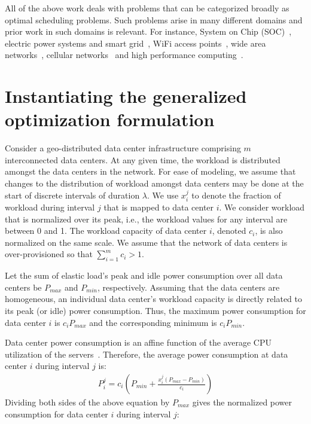 All of the above work deals with problems that can be categorized broadly as optimal scheduling problems. Such problems arise in many different domains and prior work in such domains is relevant. For instance, System on Chip (SOC)~\cite{Fang:2011:COP:1995896.1995940}, electric power systems and smart grid~\cite{Javed:2008:ULP:1485753.1485792,Logenthiran2011138,Celli:2001:PICA,FahadJavedAdOpt.SASO.2009.26}, WiFi access points~\cite{Marsan:2010:SAM:1791314.1791340}, wide area networks~\cite{Cavdar:2011:ECOC}, cellular networks~\cite{Peng:2011:BTSSaving:Mobicom} and high performance computing~\cite{Lee:ServerConsolidation:2011:Globecom,Pinheiro01loadbalancing,Yao:DCPowerReduction:2012:INFOCOM,Herodotou:Starfish:2011:CIDR,Herodotou:2011:NOS:2038916.2038934,Aikema:ElecCostHPC:2011:ISSST}.

\section{Instantiating the generalized optimization formulation}\label{sec:case1:instantiating} %
Consider a geo-distributed data center infrastructure
comprising $m$ interconnected data
centers. At any given time, the workload is distributed amongst the data
centers in the network. For ease of modeling, we assume that changes to the distribution of workload amongst data centers may be done at the start of discrete intervals of duration $\lambda$. We use $x_i^j$ to denote the fraction of workload during interval $j$ that is mapped to data center $i$.  We consider workload that is normalized over its peak, i.e., the workload values for any interval are between 0 and 1. The workload capacity of data center $i$, denoted $c_i$, is also normalized on the same scale. We assume that the network of data centers is over-provisioned so that $\sum_{i=1}^m c_i > 1$.

Let the sum of elastic load's peak and idle power consumption over all data centers be $P_{max}$ and $P_{min}$, respectively. Assuming that the data centers are homogeneous, an individual data center's workload capacity is directly related to its peak (or idle) power consumption. Thus, the maximum power consumption for data center $i$ is $c_iP_{max}$ and the corresponding minimum is $c_iP_{min}$. 

Data center power consumption is an affine function of the average CPU utilization of the servers~\cite{Fan:power:ICSA:2007}. Therefore, the average power consumption at data center $i$ during interval $j$ is: 
\begin{align}
P_i^j = c_i \left(P_{min}+\frac{x_i^j\left(P_{max}-P_{min}\right)}{c_i}\right)
\end{align}
Dividing both sides of the above equation by $P_{max}$ gives the normalized power consumption for data center $i$ during interval $j$:

